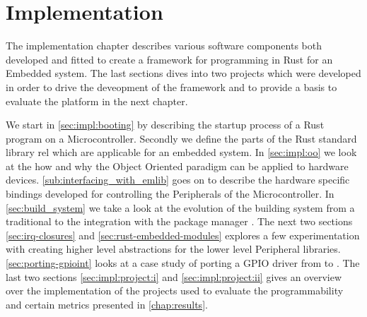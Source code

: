 \chapter{Implementation}
\label{chap:impl}

The implementation chapter describes various software components both developed and fitted to create a framework for programming in Rust for an Embedded system.
The last sections dives into two projects which were developed in order to drive the deveopment of the framework and to provide a basis to evaluate the platform in the next chapter.

We start in \autoref{sec:impl:booting} by describing the startup process of a Rust program on a Microcontroller.
Secondly we define the parts of the Rust standard library \gls{rel} which are applicable for an embedded system.
In \autoref{sec:impl:oo} we look at the how and why the Object Oriented paradigm can be applied to hardware devices.
\autoref{sub:interfacing_with_emlib} goes on to describe the hardware specific bindings developed for controlling the Peripherals of the Microcontroller.
In \autoref{sec:build_system} we take a look at the evolution of the building system from a traditional  to the integration with the {\rust} package manager {\cargo}.
The next two sections \autoref{sec:irq-closures} and \autoref{sec:rust-embedded-modules} explores a few experimentation with creating higher level abstractions for the lower level Peripheral libraries.
\autoref{sec:porting-gpioint} looks at a case study of porting a GPIO driver from {\C} to {\rust}.
The last two sections \autoref{sec:impl:project:i} and \autoref{sec:impl:project:ii} gives an overview over the implementation of the projects used to evaluate the programmability and certain metrics presented in \autoref{chap:results}.














